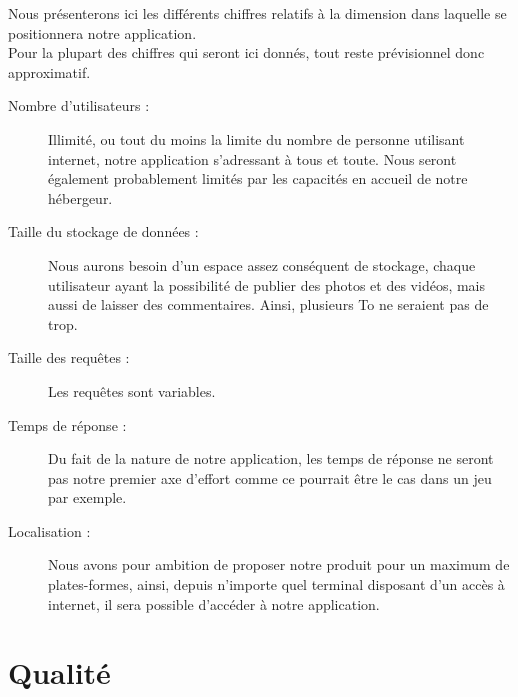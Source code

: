 \documentclass{life-fr}
\begin{document}
Nous présenterons ici les différents chiffres relatifs à la dimension dans laquelle se positionnera notre application.\\
Pour la plupart des chiffres qui seront ici donnés, tout reste prévisionnel donc approximatif.\\

\begin{description}
  \item[Nombre d’utilisateurs :]
    Illimité, ou tout du moins la limite du nombre de personne utilisant internet, notre application s’adressant à tous et toute. Nous seront également probablement limités par les capacités en accueil de notre hébergeur.
  \item[Taille du stockage de données :]
    Nous aurons besoin d’un espace assez conséquent de stockage, chaque utilisateur ayant la possibilité de publier des photos et des vidéos, mais aussi de laisser des commentaires. Ainsi, plusieurs To ne seraient pas de trop.
  \item[Taille des requêtes :]
    Les requêtes sont variables.
  \item[Temps de réponse :]
    Du fait de la nature de notre application, les temps de réponse ne seront pas notre premier axe d’effort comme ce pourrait être le cas dans un jeu par exemple.
  \item[Localisation :]
    Nous avons pour ambition de proposer notre produit pour un maximum de plates-formes, ainsi, depuis n’importe quel terminal disposant d’un accès à internet, il sera possible d’accéder à notre application.
\end{description}


\chapter{Qualité}
\end{document}
